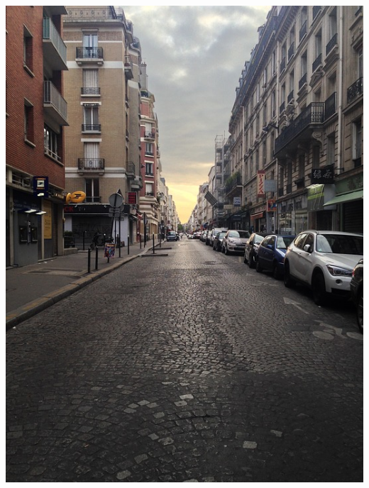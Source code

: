 \begin{center}
	\begin{multicols}{2}


	\begin{multicols}{2}
		\includegraphics[width=1\linewidth]{figure/Analysis/city.jpg}
	  \columnbreak

\end{multicols}
\end{multicols}
\end{center}
